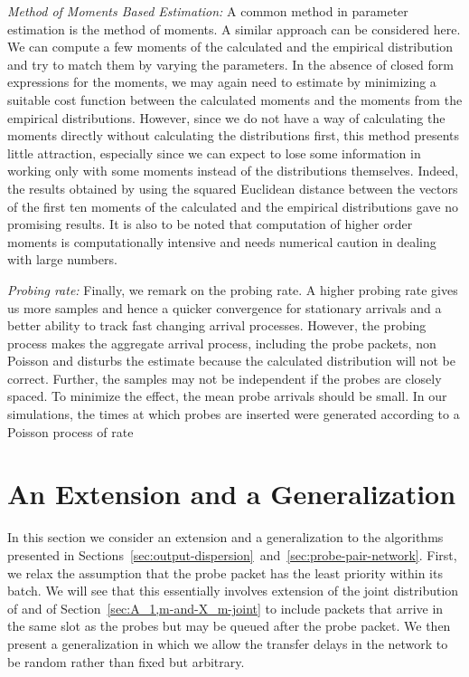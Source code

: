 \documentclass[11pt]{article}
\begin{document}
\noindent
\emph{Method of Moments Based Estimation:} A common method in
parameter estimation is the method of moments.  A similar approach can
be considered here. We can compute a few moments of the calculated and
the empirical distribution and try to match them by varying the
parameters. In the absence of closed form expressions for the moments,
we may again need to estimate by minimizing a suitable cost function
between the calculated moments and the moments from the empirical
distributions. However, since we do not have a way of calculating the
moments directly without calculating the distributions first, this
method presents little attraction, especially since we can expect to
lose some information in working only with some moments instead of the
distributions themselves.  Indeed, the results obtained by using the
squared Euclidean distance between the vectors of the first ten
moments of the calculated and the empirical distributions gave no
promising results.  It is also to be noted that computation of higher
order moments is computationally intensive and needs numerical caution
in dealing with large numbers.

\noindent
\emph{Probing rate:} Finally, we remark on the probing rate. A higher
probing rate gives us more samples and hence a quicker convergence for
stationary arrivals and a better ability to track fast changing
arrival processes. However, the probing process makes the aggregate
arrival process, including the probe packets, non Poisson and disturbs
the estimate because the calculated distribution will not be correct.
Further, the samples may not be independent if the probes are closely
spaced. To minimize the effect, the mean probe arrivals should be
small. In our simulations, the times at which probes  are
inserted were generated according to a Poisson process of rate



\section{An Extension and a Generalization}
\label{sec:generalizations}
In this section we consider an extension and a generalization to the
algorithms presented in
Sections~\ref{sec:output-dispersion}~and~\ref{sec:probe-pair-network}.
First, we relax the assumption that the probe packet has the least
priority within its batch. We will see that this essentially involves
extension of the joint distribution of  and  of
Section~\ref{sec:A_1,m-and-X_m-joint} to include packets that arrive
in the same slot as the probes but may be queued after the probe
packet.  We then present a generalization in which we allow the
transfer delays in the network to be random rather than fixed but
arbitrary.
\end{document}
